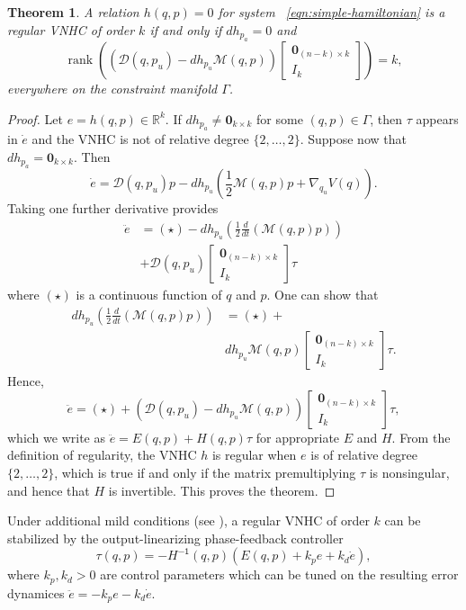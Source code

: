 \documentclass[journal,twoside,web]{ieeecolor}
\newtheorem{thm}{Theorem}%
\DeclareMathOperator{\Rank}{rank}
\newcommand*{\rank}[1]{\Rank\left(#1\right)}
\newcommand*{\inv}{^\mathsf{-1}}
\newcommand*{\R}{\mathbb{R}}
\newcommand*{\Id}[1]{I_{#1}}
\newcommand*{\Zmat}[1]{\bm{0}_{#1}}
\newcommand*{\diff}[2]{\frac{d #1}{d #2}}
\newcommand*{\simpleB}{\begin{bmatrix}\Zmat{(n-k)\times k}\\ \Id{k}\end{bmatrix}}
\begin{document}
\begin{thm}\label{thm:vnhc-regularity}
    A relation \(h(q,p) = 0\) for system ~\eqref{eqn:simple-hamiltonian}
    is a regular VNHC of order \(k\) if and only if \(dh_{p_a} = 0\) 
    and
    \[
        \rank{\left(\mathcal{D}(q,p_u) - dh_{p_u}\mathcal{M}(q,p)\right)\simpleB} = k
         ,
    \]
    everywhere on the constraint manifold \(\Gamma\).
\end{thm}
\begin{proof}
    Let \(e = h(q,p) \in \R^k\).
    If \(dh_{p_a} \neq \Zmat{k\times k}\) for some \((q,p) \in \Gamma\), 
    then \(\tau\) appears in \(\dot{e}\) and the VNHC is not of relative degree
    \(\{2,\ldots,2\}\). Suppose now that \(dh_{p_a} = \Zmat{k\times k}\).
    Then 
    \[
        \dot{e} = \mathcal{D}(q,p_u)p - 
        dh_{p_u}\left(\frac{1}{2}\mathcal{M}(q,p)p + \nabla_{q_u}V(q)\right)
        .
    \]
    Taking one further derivative provides
    \begin{align*}
        \ddot{e} 
            &= (\star) - 
            dh_{p_u}\left(\frac{1}{2}\diff{}{t}\left(\mathcal{M}(q,p)p\right)\right) 
                \\
            &+ \mathcal{D}(q,p_u)\simpleB \tau
    \end{align*}
    where \((\star)\) is a continuous function of \(q\) and \(p\).
    One can show that
    \begin{align*}
        dh_{p_u}\left(\frac{1}{2}\diff{}{t}\left(\mathcal{M}(q,p)p\right)\right)
        &= (\star) +\\
        &dh_{p_u} \mathcal{M}(q,p)\simpleB \tau
        .
    \end{align*}
    Hence,
    \[
       \ddot{e} = (\star) +
       \left(\mathcal{D}(q,p_u) - dh_{p_u}\mathcal{M}(q,p)\right) \simpleB \tau
        ,
    \]
    which we write as \( \ddot{e} = E(q,p) + H(q,p)\tau\) for appropriate \(E\)
    and \(H\).
    From the definition of regularity, the VNHC \(h\) is regular 
    when \(e\) is of relative degree \(\{2,\ldots,2\}\), which is true 
    if and only if the matrix premultiplying \(\tau\) is nonsingular, and hence
    that \(H\) is invertible. This proves the theorem.
\end{proof}

Under additional mild conditions (see \cite{vhcs_for_el_systems}), a regular VNHC of
order \(k\) can be stabilized by the output-linearizing phase-feedback
controller
\begin{equation}
    \tau(q,p) = -H\inv(q,p)\left(E(q,p) + k_p e + k_d \dot{e}\right)
    ,
\end{equation}
where \(k_p, k_d > 0\) are control parameters which can be tuned on the
resulting error dynamices \(\ddot{e} = -k_p e - k_d \dot{e}\).
\end{document}
